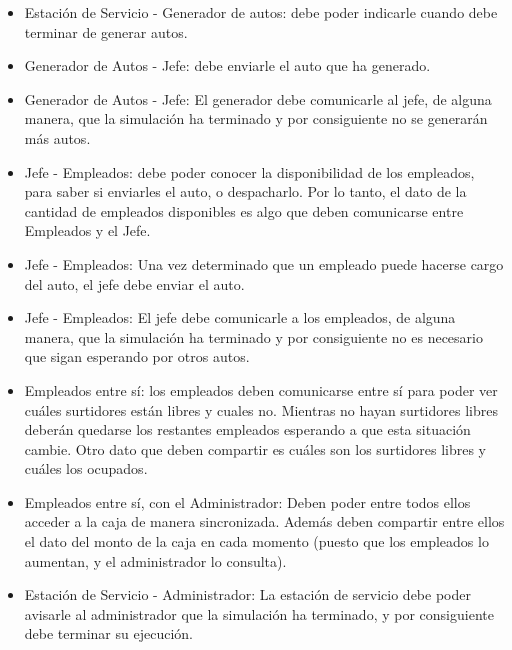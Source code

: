 \documentclass[a4paper,12pt]{article}
\begin{document}
\begin{itemize}
\item Estación de Servicio - Generador de autos: debe poder indicarle cuando debe terminar de generar autos.
\item Generador de Autos - Jefe: debe enviarle el auto que ha generado.
\item Generador de Autos - Jefe: El generador debe comunicarle al jefe, de alguna manera, que	la simulación ha terminado y por consiguiente no se generarán más autos.
\item Jefe - Empleados: debe poder conocer la disponibilidad de los empleados, para saber si enviarles el auto, o despacharlo. Por lo tanto, el dato de la cantidad de empleados disponibles es algo que deben comunicarse entre Empleados y el Jefe.
\item Jefe - Empleados: Una vez determinado que un empleado puede hacerse cargo del auto, el jefe debe enviar el auto.
\item Jefe - Empleados: El jefe debe comunicarle a los empleados, de alguna manera, que la simulación ha terminado y por consiguiente no es necesario que sigan esperando por otros autos. 
\item Empleados entre sí: los empleados deben comunicarse entre sí para poder ver cuáles surtidores están libres y cuales no. Mientras no hayan surtidores libres deberán quedarse los restantes empleados esperando a que esta situación cambie. Otro dato que deben compartir es cuáles son los surtidores libres y cuáles los ocupados.
\item Empleados entre sí, con el Administrador: Deben poder entre todos ellos acceder a la caja de manera sincronizada. Además deben compartir entre ellos el dato del monto de la caja en cada momento (puesto que los empleados lo aumentan, y el administrador lo consulta).
\item Estación de Servicio - Administrador: La estación de servicio debe poder avisarle al administrador que la simulación ha terminado, y por consiguiente debe terminar su ejecución.
\end{itemize}
\end{document}
